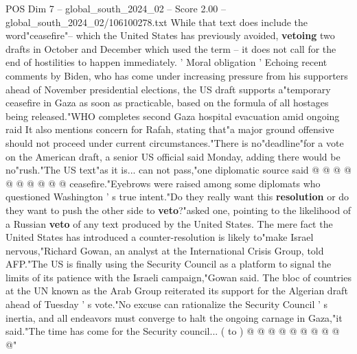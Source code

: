 \begin{textsample}{POS Dim 7 – global\_south\_2024\_02 – Score 2.00 – global\_south\_2024\_02/106100278.txt}
While that text does include the word"ceasefire"-- which the United States has previously avoided, \textbf{vetoing} two drafts in October and December which used the term -- it does not call for the end of hostilities to happen immediately. ' Moral obligation ' Echoing recent comments by Biden, who has come under increasing pressure from his supporters ahead of November presidential elections, the US draft supports a"temporary ceasefire in Gaza as soon as practicable, based on the formula of all hostages being released."WHO completes second Gaza hospital evacuation amid ongoing raid It also mentions concern for Rafah, stating that"a major ground offensive should not proceed under current circumstances."There is no"deadline"for a vote on the American draft, a senior US official said Monday, adding there would be no"rush."The US text"as it is... can not pass,"one diplomatic source said @ @ @ @ @ @ @ @ @ @ ceasefire."Eyebrows were raised among some diplomats who questioned Washington ' s true intent."Do they really want this \textbf{resolution} or do they want to push the other side to \textbf{veto}?"asked one, pointing to the likelihood of a Russian \textbf{veto} of any text produced by the United States.
The mere fact the United States has introduced a counter-resolution is likely to"make Israel nervous,"Richard Gowan, an analyst at the International Crisis Group, told AFP."The US is finally using the Security Council as a platform to signal the limits of its patience with the Israeli campaign,"Gowan said.
The bloc of countries at the UN known as the Arab Group reiterated its support for the Algerian draft ahead of Tuesday ' s vote."No excuse can rationalize the Security Council ' s inertia, and all endeavors must converge to halt the ongoing carnage in Gaza,"it said."The time has come for the Security council... ( to ) @ @ @ @ @ @ @ @ @ @"

\end{textsample}
